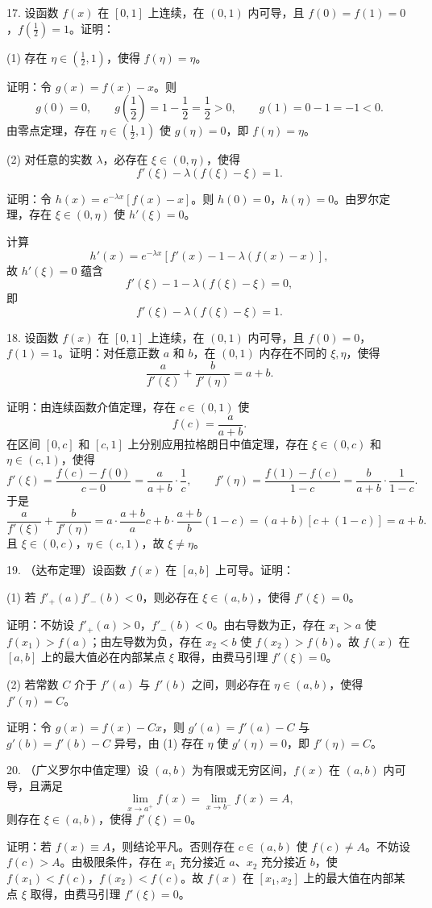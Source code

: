 17. 设函数 \(f(x)\) 在 \([0,1]\) 上连续，在 \((0,1)\) 内可导，且 \(f(0)=f(1)=0\)，\(f\left(\frac{1}{2}\right)=1\)。证明：

(1) 存在 \(\eta\in\left(\frac{1}{2},1\right)\)，使得 \(f(\eta)=\eta\)。

证明：令 \(g(x)=f(x)-x\)。则
\[ g(0)=0,\qquad g\left(\frac{1}{2}\right)=1-\frac{1}{2}=\frac{1}{2}>0,\qquad g(1)=0-1=-1<0. \]
由零点定理，存在 \(\eta\in\left(\frac{1}{2},1\right)\) 使 \(g(\eta)=0\)，即 \(f(\eta)=\eta\)。

(2) 对任意的实数 \(\lambda\)，必存在 \(\xi\in(0,\eta)\)，使得
\[ f'(\xi)-\lambda(f(\xi)-\xi)=1. \]

证明：令 \(h(x)=e^{-\lambda x}[f(x)-x]\)。则 \(h(0)=0\)，\(h(\eta)=0\)。由罗尔定理，存在 \(\xi\in(0,\eta)\) 使 \(h'(\xi)=0\)。

计算
\[ h'(x)=e^{-\lambda x}\left[f'(x)-1-\lambda(f(x)-x)\right], \]
故 \(h'(\xi)=0\) 蕴含
\[ f'(\xi)-1-\lambda(f(\xi)-\xi)=0, \]
即
\[ f'(\xi)-\lambda(f(\xi)-\xi)=1. \]

18. 设函数 \(f(x)\) 在 \([0,1]\) 上连续，在 \((0,1)\) 内可导，且 \(f(0)=0\)，\(f(1)=1\)。证明：对任意正数 \(a\) 和 \(b\)，在 \((0,1)\) 内存在不同的 \(\xi,\eta\)，使得
\[ \frac{a}{f'(\xi)}+\frac{b}{f'(\eta)}=a+b. \]

证明：由连续函数介值定理，存在 \(c\in(0,1)\) 使
\[ f(c)=\frac{a}{a+b}. \]
在区间 \([0,c]\) 和 \([c,1]\) 上分别应用拉格朗日中值定理，存在 \(\xi\in(0,c)\) 和 \(\eta\in(c,1)\)，使得
\[ f'(\xi)=\frac{f(c)-f(0)}{c-0}=\frac{a}{a+b}\cdot\frac{1}{c},\qquad f'(\eta)=\frac{f(1)-f(c)}{1-c}=\frac{b}{a+b}\cdot\frac{1}{1-c}. \]
于是
\[ \frac{a}{f'(\xi)}+\frac{b}{f'(\eta)}=a\cdot\frac{a+b}{a}c+b\cdot\frac{a+b}{b}(1-c)=(a+b)[c+(1-c)]=a+b. \]
且 \(\xi\in(0,c)\)，\(\eta\in(c,1)\)，故 \(\xi\neq\eta\)。

19. （达布定理）设函数 \(f(x)\) 在 \([a,b]\) 上可导。证明：

(1) 若 \(f'_+(a)f'_-(b)<0\)，则必存在 \(\xi\in(a,b)\)，使得 \(f'(\xi)=0\)。

证明：不妨设 \(f'_+(a)>0\)，\(f'_-(b)<0\)。由右导数为正，存在 \(x_1>a\) 使 \(f(x_1)>f(a)\)；由左导数为负，存在 \(x_2<b\) 使 \(f(x_2)>f(b)\)。故 \(f(x)\) 在 \([a,b]\) 上的最大值必在内部某点 \(\xi\) 取得，由费马引理 \(f'(\xi)=0\)。

(2) 若常数 \(C\) 介于 \(f'(a)\) 与 \(f'(b)\) 之间，则必存在 \(\eta\in(a,b)\)，使得 \(f'(\eta)=C\)。

证明：令 \(g(x)=f(x)-Cx\)，则 \(g'(a)=f'(a)-C\) 与 \(g'(b)=f'(b)-C\) 异号，由 (1) 存在 \(\eta\) 使 \(g'(\eta)=0\)，即 \(f'(\eta)=C\)。

20. （广义罗尔中值定理）设 \((a,b)\) 为有限或无穷区间，\(f(x)\) 在 \((a,b)\) 内可导，且满足
\[ \lim_{x\to a^{+}}f(x)=\lim_{x\to b^{-}}f(x)=A, \]
则存在 \(\xi\in(a,b)\)，使得 \(f'(\xi)=0\)。

证明：若 \(f(x)\equiv A\)，则结论平凡。否则存在 \(c\in(a,b)\) 使 \(f(c)\neq A\)。不妨设 \(f(c)>A\)。由极限条件，存在 \(x_1\) 充分接近 \(a\)、\(x_2\) 充分接近 \(b\)，使 \(f(x_1)<f(c)\)，\(f(x_2)<f(c)\)。故 \(f(x)\) 在 \([x_1,x_2]\) 上的最大值在内部某点 \(\xi\) 取得，由费马引理 \(f'(\xi)=0\)。
